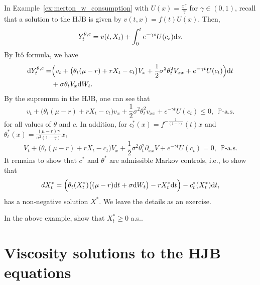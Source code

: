\documentclass[11pt]{book}
\newcommand{\dd}{\text{\normalfont d}}
\newcommand{\dt}{\text{\normalfont d}t}
\newcommand{\ds}{\text{\normalfont d}s}
\newcommand{\dW}{\text{\normalfont d}W}
\begin{document}
\begin{eg}\label{eg:martingle_consumption}
In Example~\ref{ex:merton_w_consumption} with $U(x)=\frac{x^\gamma}{\gamma}$ for $\gamma\in(0,1)$, %
recall that a solution to the HJB is given by $v(t,x)=f(t)U(x)$. Then, 
	\begin{equation}
		Y^{\theta,c}_t=v(t,X_t)+\int_0^te^{-\gamma s}U(c_s){{\ds}}.
	\end{equation}
	By It\^o formula, we have 
	\begin{equation}
	\begin{split}
				\dd Y_t^{\theta,c}=&\Big(v_t + \big(\theta_t(\mu-r)+rX_t-c_t\big) V_{x}+ 
\frac12\sigma^2\theta_t^2 V_{xx}+e^{-\gamma t}U(c_t)\Big){\dt}\\
		&+\sigma\theta_t V_{x} \dW_t. 
	\end{split}
	\end{equation}
	By the supremum in the HJB, one can see that 
	\begin{equation}
		{v}_{t}+ \big(\theta_t(\mu-r)+rX_t-c_t\big) v_{x}
		+\frac12\sigma^2\theta_t^2v_{xx}+e^{-\gamma t}U(c_t)\le0,~~\mathbb{P}\textrm{-a.s.}
	\end{equation}
	for all values of  $\theta$ and $c$. In addition, for $c^*_t(x)=f^{-\frac{1}{(1-\gamma)}}(t)x$ and $\theta^*_t(x)=\frac{(\mu-r)\gamma}{\sigma^2(1-\gamma)}x$, 
	\begin{equation}
		{V}_{t}+ \big(\theta_t(\mu-r)+rX_t-c_t\big) V_{x}
		+\frac12\sigma^2\theta_t^2\partial_{xx} V+e^{-\gamma t}U(c_t)=0,~~\mathbb{P}\textrm{-a.s.}
	\end{equation}
It remains to show that $c^*$ and $\theta^*$ are admissible Markov controls, i.e., to show that 
	\begin{equation}
		dX^*_t=\Big(\theta_t(X^*_t)\big((\mu-r) {\dt}+\sigma \dW_t\big)-rX^*_t{\dt}\Big)-c^*_t(X^*_t){\dt},
	\end{equation}
	has a non-negative solution $X^*$. We leave the details as an exercise. 
\end{eg}
\begin{ex}
   In the above example,  show that $X^*_t\ge0$ a.s..
\end{ex}



\section{Viscosity solutions to the HJB equations}
\end{document}
